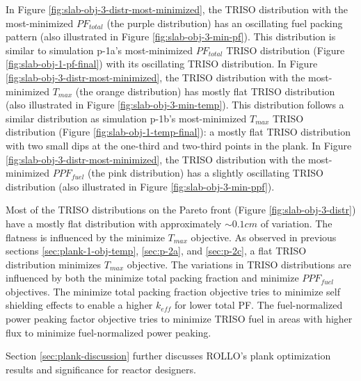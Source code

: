 In Figure \ref{fig:slab-obj-3-distr-most-minimized}, the TRISO distribution with the
most-minimized $PF_{total}$ (the purple distribution) has an oscillating fuel 
packing pattern (also illustrated in Figure \ref{fig:slab-obj-3-min-pf}).
This distribution is similar to simulation p-1a's most-minimized $PF_{total}$ TRISO 
distribution (Figure \ref{fig:slab-obj-1-pf-final}) with its oscillating TRISO distribution. 
In Figure \ref{fig:slab-obj-3-distr-most-minimized}, the TRISO distribution with the 
most-minimized $T_{max}$ (the orange distribution) has mostly flat TRISO distribution 
(also illustrated in Figure \ref{fig:slab-obj-3-min-temp}). 
This distribution follows a similar distribution as simulation p-1b's most-minimized 
$T_{max}$ TRISO distribution (Figure \ref{fig:slab-obj-1-temp-final}): a mostly flat 
TRISO distribution with two small dips at the one-third and two-third points in the 
plank.
In Figure \ref{fig:slab-obj-3-distr-most-minimized}, the TRISO distribution with the
most-minimized $PPF_{fuel}$ (the pink distribution) has a 
slightly oscillating TRISO distribution (also illustrated in Figure 
\ref{fig:slab-obj-3-min-ppf}).

Most of the \gls{TRISO} distributions on the Pareto front (Figure 
\ref{fig:slab-obj-3-distr}) have a mostly flat distribution with approximately 
$\sim0.1cm$ of variation. 
The flatness is influenced by the minimize $T_{max}$ objective. 
As observed in previous sections \ref{sec:plank-1-obj-temp}, \ref{sec:p-2a}, and 
\ref{sec:p-2c}, a flat \gls{TRISO} distribution minimizes $T_{max}$ objective.
The variations in \gls{TRISO} distributions are influenced by both the minimize 
total packing fraction and minimize $PPF_{fuel}$ objectives. 
The minimize total packing fraction objective tries to minimize self shielding effects 
to enable a higher $k_{eff}$ for lower total PF. 
The fuel-normalized power peaking factor objective tries to minimize 
TRISO fuel in areas with higher flux to minimize fuel-normalized power peaking.

Section \ref{sec:plank-discussion} further discusses \gls{ROLLO}'s plank 
optimization results and significance for reactor designers.

